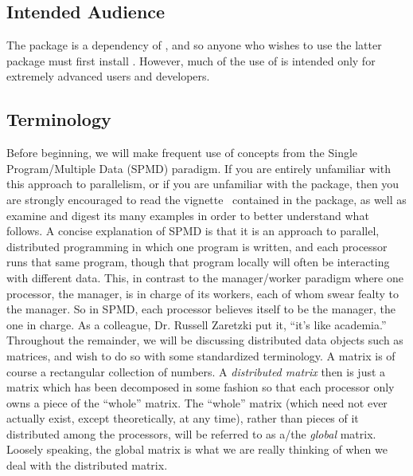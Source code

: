 \subsection{Intended Audience}
\label{sec:more_examples}

The  package is a dependency of , and so anyone who wishes to use the latter package must first install .  However, much of the use of  is intended only for extremely advanced users and developers.





\subsection[]{Terminology}
Before beginning, we will make frequent use of concepts from the Single Program/Multiple Data (SPMD) paradigm.  If you are entirely unfamiliar with this approach to parallelism, or if you are unfamiliar with the  package, then you are strongly encouraged to read the vignette~\citep{Chen2012pbdMPIvignette} contained in the  package, as well as examine and digest its many examples in order to better understand what follows.
\np
A concise explanation of SPMD is that it is an approach to parallel, distributed programming in which one program is written, and each processor runs that same program, though that program locally will often be interacting with different data.  This, in contrast to the manager/worker paradigm where one processor, the manager, is in charge of its workers, each of whom swear fealty to the manager.  So in SPMD, each processor believes itself to be the manager, the one in charge.  As a colleague, Dr. Russell Zaretzki put it, ``it's like academia.''
\np
Throughout the remainder, we will be discussing distributed data objects such as matrices, and wish to do so with some standardized terminology.  A matrix is of course a rectangular collection of numbers.  A \emph{distributed matrix} then is just a matrix which has been decomposed in some fashion so that each processor only owns a piece of the ``whole'' matrix.  The ``whole'' matrix (which need not ever actually exist, except theoretically, at any time), rather than pieces of it distributed among the processors, will be referred to as a/the \emph{global} matrix.  Loosely speaking, the global matrix is what we are really thinking of when we deal with the distributed matrix.  

